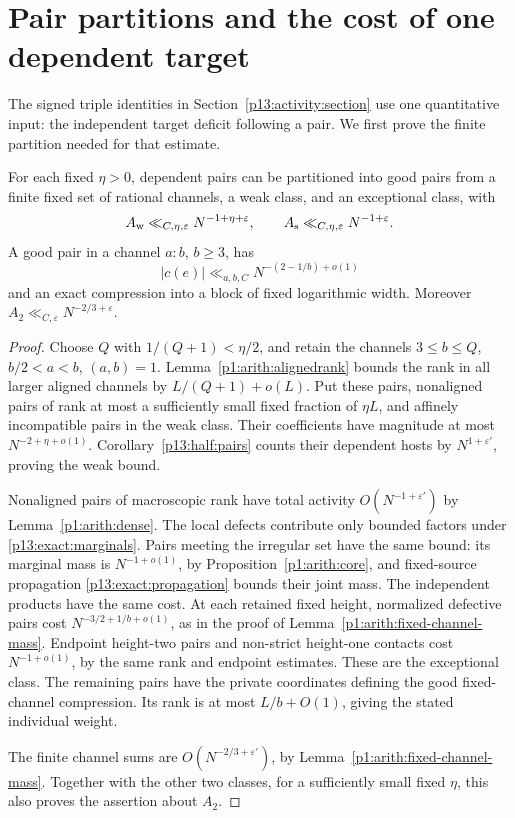 \section{Pair partitions and the cost of one dependent target}
\label{p14:comp:activity}

The signed triple identities in Section~\ref{p13:activity:section}
use one quantitative input: the independent target deficit following
a pair.  We first prove the finite partition needed for that estimate.

\begin{lemma}
\label{p13:activity:pair-partition}
For each fixed \(\eta>0\), dependent pairs can be partitioned
into good pairs from a finite fixed set of rational channels,
a weak class, and an exceptional class, with
\[
 A_{\rm w}\ll_{C,\eta,\varepsilon}N^{-1+\eta+\varepsilon},
 \qquad A_{\rm s}\ll_{C,\eta,\varepsilon}N^{-1+\varepsilon}.
\]
A good pair in a channel \(a:b\), \(b\ge3\), has
\[
 |c(e)|\ll_{a,b,C}N^{-(2-1/b)+o(1)}
\]
and an exact compression into a block of fixed logarithmic
width. Moreover \(A_2\ll_{C,\varepsilon}N^{-2/3+\varepsilon}\).
\end{lemma}

\begin{proof}
Choose \(Q\) with \(1/(Q+1)<\eta/2\), and retain the
channels \(3\le b\le Q\), \(b/2<a<b\), \((a,b)=1\).
Lemma~\ref{p1:arith:alignedrank} bounds the rank in all
larger aligned channels by \(L/(Q+1)+o(L)\).
Put these pairs, nonaligned pairs of rank at most a
sufficiently small fixed fraction of \(\eta L\), and
affinely incompatible pairs in the weak class.
Their coefficients have magnitude at most
\(N^{-2+\eta+o(1)}\).
Corollary~\ref{p13:half:pairs} counts their dependent hosts
by \(N^{1+\varepsilon'}\), proving the weak bound.

Nonaligned pairs of macroscopic rank have total activity
\(O(N^{-1+\varepsilon'})\) by Lemma~\ref{p1:arith:dense}.
The local defects contribute only bounded factors under
\eqref{p13:exact:marginals}.
Pairs meeting the irregular set have the same bound:
its marginal mass is \(N^{-1+o(1)}\), by
Proposition~\ref{p1:arith:core}, and fixed-source
propagation \eqref{p13:exact:propagation} bounds their
joint mass. The independent products have the same cost.
At each retained fixed height, normalized defective pairs
cost \(N^{-3/2+1/b+o(1)}\), as in the proof of
Lemma~\ref{p1:arith:fixed-channel-mass}.
Endpoint height-two pairs and non-strict height-one contacts
cost \(N^{-1+o(1)}\), by the same rank and endpoint estimates.
These are the exceptional class.
The remaining pairs have the private coordinates defining
the good fixed-channel compression. Its rank is at most
\(L/b+O(1)\), giving the stated individual weight.

The finite channel sums are \(O(N^{-2/3+\varepsilon'})\),
by Lemma~\ref{p1:arith:fixed-channel-mass}. Together with
the other two classes, for a sufficiently small fixed
\(\eta\), this also proves the assertion about \(A_2\).
\end{proof}

